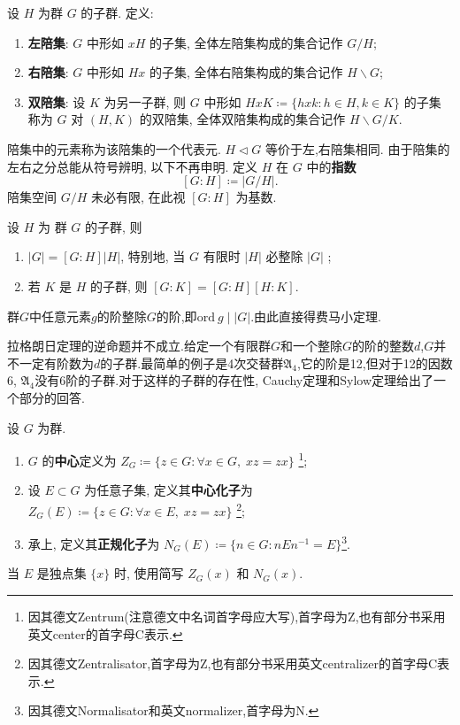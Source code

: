 \begin{definition}\label{def:coset}
	设 $H$ 为群 $G$ 的子群. 定义:
	\begin{enumerate}
		\item \textbf{左陪集}: $G$ 中形如 $xH$ 的子集, 全体左陪集构成的集合记作 $G/H$;
		\item \textbf{右陪集}: $G$ 中形如 $Hx$ 的子集, 全体右陪集构成的集合记作 $H \backslash G$;
		\item \textbf{双陪集}: 设 $K$ 为另一子群, 则 $G$ 中形如 $HxK \coloneqq \{hxk : h \in H, k \in K\}$ 的子集称为 $G$ 对 $(H,K)$ 的双陪集, 全体双陪集构成的集合记作 $H \backslash G/K$.
	\end{enumerate}
	陪集中的元素称为该陪集的一个代表元. $H \lhd G$ 等价于左,右陪集相同. 由于陪集的左右之分总能从符号辨明, 以下不再申明. 定义 $H$ 在 $G$ 中的\textbf{指数}
	\[ [G:H] \coloneqq |G/H|. \]
	陪集空间 $G/H$ 未必有限, 在此视 $[G:H]$ 为基数. 
\end{definition}
\begin{theorem}[Lagrange定理]\label{thm:Lagrange}
	设 $H$ 为 群 $G$ 的子群, 则
	\begin{enumerate}
		\item $|G| = [G:H] |H|$, 特别地, 当 $G$ 有限时 $|H|$ 必整除 $|G|$ ;
		\item 若 $K$ 是 $H$ 的子群, 则 $[G:K] =[G:H][H:K]$.
	\end{enumerate}
\end{theorem}
\begin{corollary}
	群$G$中任意元素$g$的阶整除$G$的阶,即$\mathrm{ord}\ g\mid|G|$.由此直接得费马小定理.
\end{corollary}

拉格朗日定理的逆命题并不成立.给定一个有限群$G$和一个整除$G$的阶的整数$d$,$G$并不一定有阶数为$d$的子群.最简单的例子是4次交替群$\mathfrak{A}_4$,它的阶是12,但对于12的因数6, $\mathfrak{A}_4$没有6阶的子群.对于这样的子群的存在性, Cauchy定理和Sylow定理给出了一个部分的回答.
\begin{definition}
	设 $G$ 为群.
	\begin{enumerate}
		\item $G$ 的\textbf{中心}定义为 $Z_G \coloneqq \{z \in G : \forall x \in G, \; xz=zx\}$
		\footnote{因其德文Zentrum(注意德文中名词首字母应大写),首字母为Z,也有部分书采用英文center的首字母C表示.};
		\item 设 $E \subset G$ 为任意子集, 定义其\textbf{中心化子}为 $Z_G(E) \coloneqq \{z \in G : \forall x \in E, \; xz=zx \}$
		\footnote{因其德文Zentralisator,首字母为Z,也有部分书采用英文centralizer的首字母C表示.};
		\item 承上, 定义其\textbf{正规化子}为 $N_G(E) \coloneqq \{n \in G : nEn^{-1} = E \}$\footnote{因其德文Normalisator和英文normalizer,首字母为N.}.
	\end{enumerate}
	当 $E$ 是独点集 $\{x\}$ 时, 使用简写 $Z_G(x)$ 和 $N_G(x)$.
\end{definition}

